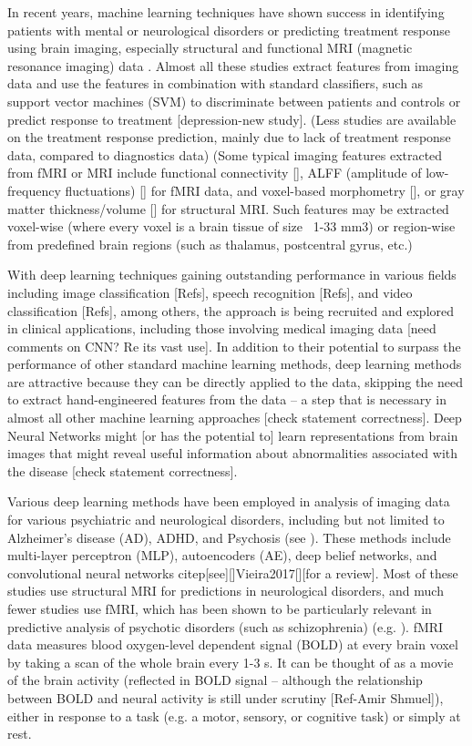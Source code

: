\documentclass{article} %
\begin{document}
In recent years, machine learning techniques have shown success in identifying patients with mental or neurological disorders or predicting treatment response using brain imaging, especially structural and functional MRI (magnetic resonance imaging) data \citep{Gheiratmand2017, Orru2012, ?? Add more}. Almost all these studies extract features from imaging data and use the features in combination with standard classifiers, such as support vector machines (SVM) \citep{Orru2012, Wolfers2015} to discriminate between patients and controls or predict response to treatment [depression-new study]. (Less studies are available on the treatment response prediction, mainly due to lack of treatment response data, compared to diagnostics data) (Some typical imaging features extracted from fMRI or MRI include functional connectivity [], ALFF (amplitude of low-frequency fluctuations) [] for fMRI data, and voxel-based morphometry [], or gray matter thickness/volume [] for structural MRI. Such features may be extracted voxel-wise (where every voxel is a brain tissue of size ~1-33 mm3) or region-wise from predefined brain regions (such as thalamus, postcentral gyrus, etc.)

With deep learning techniques gaining outstanding performance in various fields including image classification [Refs], speech recognition [Refs], and video classification [Refs], among others, the approach is being recruited and explored in clinical applications, including those involving medical imaging data \citep{Shen2017, Litjens2017, Gulshan2016} [need comments on CNN? Re its vast use]. In addition to their potential to surpass the performance of other standard machine learning methods, deep learning methods are attractive because they can be directly applied to the data, skipping the need to extract hand-engineered features from the data – a step that is necessary in almost all other machine learning approaches [check statement correctness]. Deep Neural Networks might [or has the potential to] learn representations from brain images that might reveal useful information about abnormalities associated with the disease [check statement correctness]. 

Various deep learning methods have been employed in analysis of imaging data for various psychiatric and neurological disorders, including but not limited to Alzheimer’s disease (AD), ADHD, and Psychosis (see \citep{Vieira2017}). These methods include multi-layer perceptron (MLP), autoencoders (AE), deep belief networks, and convolutional neural networks citep[see][]{Vieira2017}[][for a review]. Most of these studies use structural MRI for predictions in neurological disorders, and much fewer studies use fMRI, which has been shown to be particularly relevant in predictive analysis of psychotic disorders (such as schizophrenia) (e.g. \citep{Damaraju2014, Calhoun2009}). fMRI data measures blood oxygen-level dependent signal (BOLD) at every brain voxel by taking a scan of the whole brain every 1-3 s. It can be thought of as a movie of the brain activity (reflected in BOLD signal – although the relationship between BOLD and neural activity is still under scrutiny [Ref-Amir Shmuel]), either in response to a task (e.g. a motor, sensory, or cognitive task) or simply at rest. 	
\end{document}
